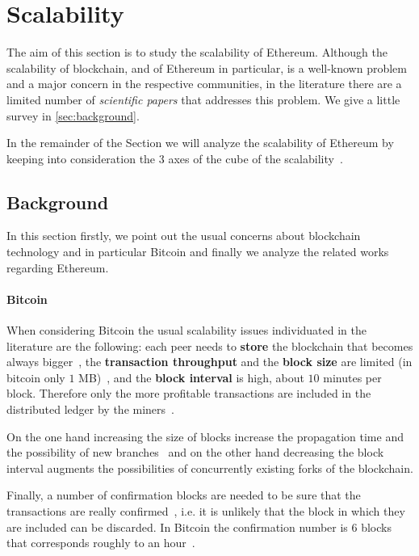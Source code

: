 \section{Scalability}
\label{sec:scalability}
The aim of this section is to study the scalability of Ethereum.
Although the scalability of blockchain, and of Ethereum in particular, is a
well-known problem and a major concern in the respective communities, in the
literature there are a limited number of \emph{scientific papers} that
addresses this problem.
We give a little survey in \autoref{sec:background}.

In the remainder of the Section we will analyze the scalability of Ethereum by
keeping into consideration the 3 axes of the cube of the
scalability~\cite{bib:art-of-scalability}.


\subsection{Background}

In this section firstly, we point out the usual concerns about blockchain
technology and in particular Bitcoin and finally we analyze the related works
regarding Ethereum.

\paragraph{Bitcoin} 

When considering Bitcoin
the  usual scalability issues individuated in the literature are the following:
each peer needs to \textbf{store} the blockchain that becomes always 
bigger~\cite{bib:blockchain-challenges-opportunites-survey, bib:taxonomy}, 
the \textbf{transaction throughput} and 
the \textbf{block size} are limited (in bitcoin only $1$
MB)~\cite{bib:blockchain-challenges-opportunites-survey, bib:taxonomy}, and
the \textbf{block interval} is high, about $10$ minutes per block.
Therefore only the more profitable transactions are included in the distributed 
ledger by the
miners~\cite{bib:blockchain-challenges-opportunites-survey,wood2018ethereum}.

On the one hand increasing the size of blocks increase the propagation time
and the possibility of new
branches~\cite{bib:blockchain-challenges-opportunites-survey} and on the other
hand decreasing the block interval augments the possibilities of concurrently
existing forks of the blockchain.


Finally, a number of confirmation blocks are
needed to be sure that the transactions are really 
confirmed~\cite{bib:taxonomy}, i.e. it is unlikely that the block in which
they are included can be discarded.
In Bitcoin the 
confirmation number is 6 blocks that corresponds roughly to an hour~\cite{}.
 
